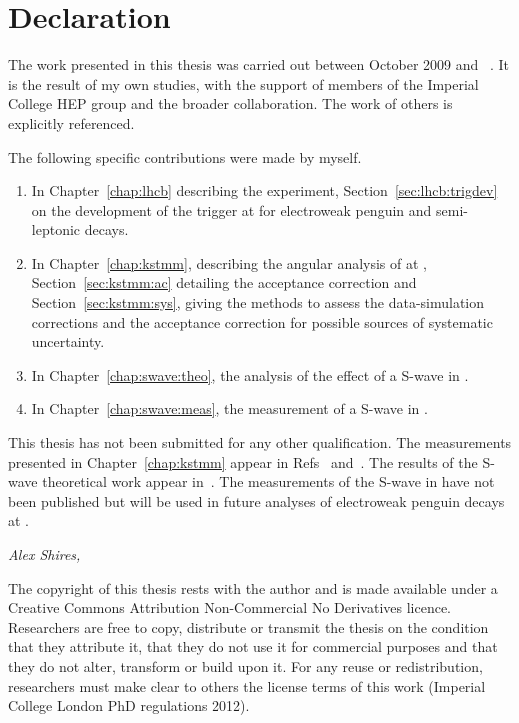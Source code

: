 \chapter*{Declaration}

The work presented in this thesis was carried out between October 2009 and \monthname~\the\year. 
It is the result of my own studies, with the support of members of the Imperial College HEP group and 
the broader \lhcb collaboration. The work of others is explicitly referenced.

The following specific contributions were made by myself.
\begin{enumerate}
\item In Chapter~\ref{chap:lhcb} describing the \lhcb experiment, Section~\ref{sec:lhcb:trigdev} on the development of the trigger at \lhcb for electroweak penguin and semi-leptonic decays.
\item In Chapter~\ref{chap:kstmm}, describing the angular analysis of \BdToKstmm at \lhcb, 
Section~\ref{sec:kstmm:ac} detailing the acceptance correction and 
Section~\ref{sec:kstmm:sys}, giving the methods to assess the data-simulation corrections and the acceptance correction for possible sources of systematic uncertainty. 
\item In Chapter~\ref{chap:swave:theo}, the analysis of the effect of a \kpi S-wave in \BdToKstll.
\item In Chapter~\ref{chap:swave:meas}, the measurement of a \kpi S-wave in \BdToKstmm.
\end{enumerate}

This thesis has not been submitted for any other qualification. 
The measurements presented in Chapter~\ref{chap:kstmm} appear in Refs~\cite{LHCb-PAPER-2011-020} 
and~\cite{Aaij:2013iag}.
The results of the \kpi S-wave theoretical work appear in~\cite{Blake:2012mb}.
The measurements of the \kpi S-wave in \BdToKstmm have not been published but will be used 
in future analyses of electroweak penguin decays at \lhcb.

\begin{flushright} 
\emph{Alex Shires, \the\day~\monthname~\the\year}
\end{flushright}

\vspace*{\fill}



{\scriptsize The copyright of this thesis rests with the author and is made available under a 
Creative Commons Attribution Non-Commercial No Derivatives licence. 
Researchers are free to copy, distribute or transmit the thesis on the condition that they attribute it, 
that they do not use it for commercial purposes and that they do not alter, transform or build upon it.
 For any reuse or redistribution, researchers must make clear to others the license terms of this work
 (Imperial College London  PhD regulations 2012).}
 

